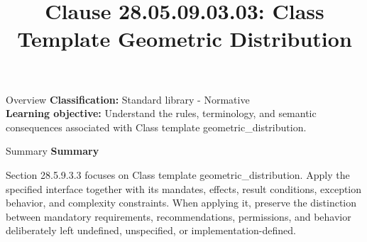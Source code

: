 \documentclass[10pt,letterpaper]{article}
\title{Clause 28.05.09.03.03: Class Template Geometric Distribution}
\author{}
\date{}
\begin{document}
\maketitle
\begin{CornellOverviewBox}{Overview}
\textbf{Classification:} Standard library - Normative\\[2pt]
\textbf{Learning objective:} Understand the rules, terminology, and semantic consequences associated with Class template geometric\_distribution.
\end{CornellOverviewBox}\begin{CornellSummaryBox}{Summary}
{\sffamily\bfseries\color{Accent} Summary}\par\vspace{3pt}Section 28.5.9.3.3 focuses on Class template geometric\_distribution. Apply the specified interface together with its mandates, effects, result conditions, exception behavior, and complexity constraints. When applying it, preserve the distinction between mandatory requirements, recommendations, permissions, and behavior deliberately left undefined, unspecified, or implementation-defined.
\end{CornellSummaryBox}
\end{document}
